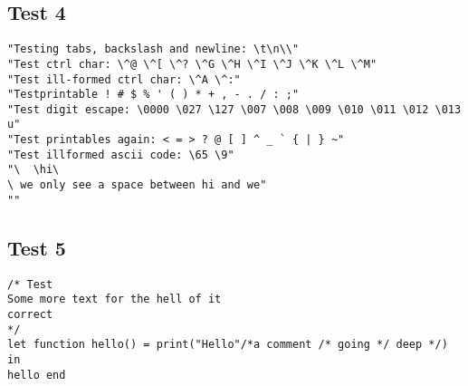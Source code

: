 \documentclass{article}
\begin{document}
\subsection{Test 4}
\begin{lstlisting}[frame=single]
"Testing tabs, backslash and newline: \t\n\\"
"Test ctrl char: \^@ \^[ \^? \^G \^H \^I \^J \^K \^L \^M"
"Test ill-formed ctrl char: \^A \^:"
"Testprintable ! # $ % ' ( ) * + , - . / : ;"
"Test digit escape: \0000 \027 \127 \007 \008 \009 \010 \011 \012 \013 u"
"Test printables again: < = > ? @ [ ] ^ _ ` { | } ~"
"Test illformed ascii code: \65 \9"
"\	\hi\
\ we only see a space between hi and we"
""
\end{lstlisting}

\subsection{Test 5}
\begin{lstlisting}[frame=single]
/* Test 
Some more text for the hell of it
correct
*/
let function hello() = print("Hello"/*a comment /* going */ deep */) in 
hello end
\end{lstlisting}
\end{document}
